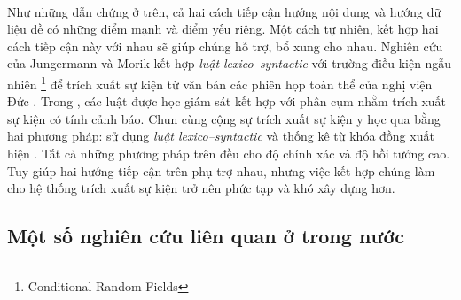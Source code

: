 \\
\noindent Như những dẫn chứng ở trên, cả hai cách tiếp cận hướng nội dung và hướng dữ liệu đề có những điểm mạnh và điểm yếu riêng. Một cách tự nhiên, kết hợp hai cách tiếp cận này với nhau sẽ giúp chúng hỗ trợ, bổ xung cho nhau. Nghiên cứu của Jungermann và Morik kết hợp \emph{luật lexico--syntactic} với trường điều kiện ngẫu nhiên \footnote{Conditional Random Fields} để trích xuất sự kiện từ văn bản các phiên họp toàn thể của nghị viện Đức \cite{FK08}. Trong \cite{JHP07}, các luật được học giám sát kết hợp với phân cụm nhằm trích xuất sự kiện có tính cảnh báo. Chun cùng cộng sự trích xuất sự kiện y học qua bằng hai phương pháp: sử dụng \emph{luật lexico--syntactic} và thống kê từ khóa đồng xuất hiện \cite{CHR04}. Tất cả những phương pháp trên đều cho độ chính xác và độ hồi tưởng cao. Tuy giúp hai hướng tiếp cận trên phụ trợ nhau, nhưng việc kết hợp chúng làm cho hệ thống trích xuất sự kiện trở nên phức tạp và khó xây dựng hơn.



	\subsection{Một số nghiên cứu liên quan ở trong nước}

